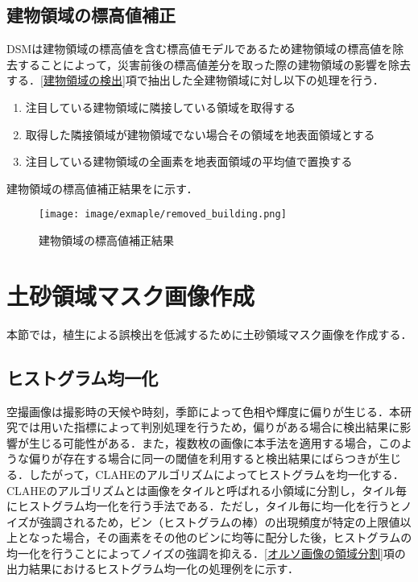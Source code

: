    \subsection{建物領域の標高値補正}
      DSMは建物領域の標高値を含む標高値モデルであるため建物領域の標高値を除去することによって，災害前後の標高値差分を取った際の建物領域の影響を除去する．\ref{建物領域の検出}項で抽出した全建物領域に対し以下の処理を行う．

      \begin{enumerate}
        \setlength{\itemsep}{-5pt}
        \item 注目している建物領域に隣接している領域を取得する
        \item 取得した隣接領域が建物領域でない場合その領域を地表面領域とする
        \item 注目している建物領域の全画素を地表面領域の平均値で置換する
      \end{enumerate}

      建物領域の標高値補正結果をに示す．

      \begin{figure}[t]
        \centering
        \texttt{[image: image/exmaple/removed\_building.png]}
        \caption{建物領域の標高値補正結果}
        \label{建物領域の標高値補正結果}
      \end{figure}



  \section{土砂領域マスク画像作成}
    \label{土砂領域マスク画像作成}
    本節では，植生による誤検出を低減するために土砂領域マスク画像を作成する．


    \subsection{ヒストグラム均一化}
      空撮画像は撮影時の天候や時刻，季節によって色相や輝度に偏りが生じる．本研究では用いた指標によって判別処理を行うため，偏りがある場合に検出結果に影響が生じる可能性がある．また，複数枚の画像に本手法を適用する場合，このような偏りが存在する場合に同一の閾値を利用すると検出結果にばらつきが生じる．したがって，CLAHEのアルゴリズム\cite{CLAHEのアルゴリズム}によってヒストグラムを均一化する．CLAHEのアルゴリズムとは画像をタイルと呼ばれる小領域に分割し，タイル毎にヒストグラム均一化を行う手法である．ただし，タイル毎に均一化を行うとノイズが強調されるため，ビン（ヒストグラムの棒）の出現頻度が特定の上限値以上となった場合，その画素をその他のビンに均等に配分した後，ヒストグラムの均一化を行うことによってノイズの強調を抑える．\ref{オルソ画像の領域分割}項の出力結果におけるヒストグラム均一化の処理例をに示す．

